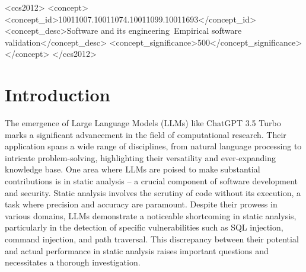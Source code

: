\documentclass[acmsmall]{acmart}
\begin{document}
\begin{CCSXML}
<ccs2012>
    <concept>
      <concept_id>10011007.10011074.10011099.10011693</concept_id>
      <concept_desc>Software and its engineering~Empirical software validation</concept_desc>
      <concept_significance>500</concept_significance>
      </concept>
  </ccs2012>
\end{CCSXML}
  



\maketitle

\section{Introduction}
The emergence of Large Language Models (LLMs) like ChatGPT 3.5 Turbo marks a significant advancement in the field of computational research. Their application spans a wide range of disciplines, from natural language processing to intricate problem-solving, highlighting their versatility and ever-expanding knowledge base. One area where LLMs are poised to make substantial contributions is in static analysis – a crucial component of software development and security. Static analysis involves the scrutiny of code without its execution, a task where precision and accuracy are paramount.
Despite their prowess in various domains, LLMs demonstrate a noticeable shortcoming in static analysis, particularly in the detection of specific vulnerabilities such as SQL injection, command injection, and path traversal. This discrepancy between their potential and actual performance in static analysis raises important questions and necessitates a thorough investigation.
\end{document}
